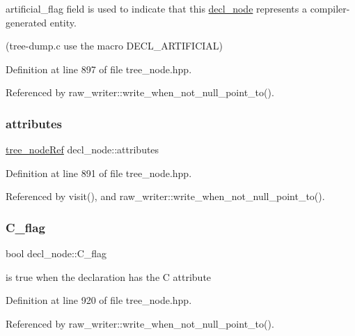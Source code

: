 artificial\+\_\+flag field is used to indicate that this \hyperlink{structdecl__node}{decl\+\_\+node} represents a compiler-\/generated entity. 

(tree-\/dump.\+c use the macro D\+E\+C\+L\+\_\+\+A\+R\+T\+I\+F\+I\+C\+I\+AL) 

Definition at line 897 of file tree\+\_\+node.\+hpp.



Referenced by raw\+\_\+writer\+::write\+\_\+when\+\_\+not\+\_\+null\+\_\+point\+\_\+to().

\mbox{\label{structdecl__node_a2042ff2aba0abb5b7c6c38e2490d8c1d}} 
\subsubsection{\texorpdfstring{attributes}{attributes}}
{\footnotesize\ttfamily \hyperlink{tree__node_8hpp_a6ee377554d1c4871ad66a337eaa67fd5}{tree\+\_\+node\+Ref} decl\+\_\+node\+::attributes}



Definition at line 891 of file tree\+\_\+node.\+hpp.



Referenced by visit(), and raw\+\_\+writer\+::write\+\_\+when\+\_\+not\+\_\+null\+\_\+point\+\_\+to().

\mbox{\label{structdecl__node_a211b05cc143eac8340ae3509c2519243}} 
\subsubsection{\texorpdfstring{C\+\_\+flag}{C\_flag}}
{\footnotesize\ttfamily bool decl\+\_\+node\+::\+C\+\_\+flag}



is true when the declaration has the C attribute 



Definition at line 920 of file tree\+\_\+node.\+hpp.



Referenced by raw\+\_\+writer\+::write\+\_\+when\+\_\+not\+\_\+null\+\_\+point\+\_\+to().

\mbox{\label{structdecl__node_a0182832cf7a99a9ad11386a0fd499e7a}} 
